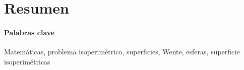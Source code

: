 \section{Resumen}


\paragraph{Palabras clave} Matemáticas, problema isoperimétrico, superficies, Wente, esferas, superficie isoperimétricas